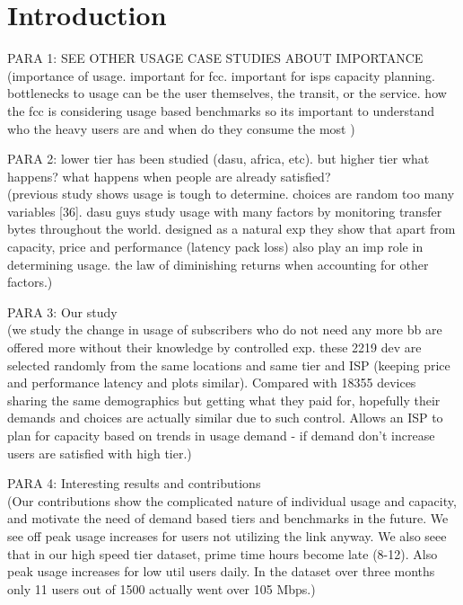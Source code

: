 \section{Introduction}\label{sec:introduction}

PARA 1: SEE OTHER USAGE CASE STUDIES ABOUT IMPORTANCE\\
(importance of usage. important for fcc. important for isps capacity planning. bottlenecks to usage can be the user themselves, the transit, or the service. how the fcc is considering usage based benchmarks so its important to understand who the heavy users are and when do they consume the most )

PARA 2: lower tier has been studied (dasu, africa, etc). but higher tier what happens? what happens when people are already satisfied?\\
(previous study shows usage is tough to determine. choices are random too many variables [36]. dasu guys study usage with many factors by monitoring transfer bytes throughout the world. designed as a natural exp they show that apart from capacity, price and performance (latency pack loss) also play an imp role in determining usage. the law of diminishing returns when accounting for other factors.)

PARA 3: Our study\\
(we study the change in usage of subscribers who do not need any more bb are offered more without their knowledge by controlled exp. these 2219 dev are selected randomly from the same locations and same tier and ISP (keeping price and performance latency and plots similar). Compared with 18355 devices sharing the same demographics but getting what they paid for, hopefully their demands and choices are actually similar due to such control. Allows an ISP to plan for capacity based on trends in usage demand - if demand don't increase users are satisfied with high tier.)

PARA 4: Interesting results and contributions\\
(Our contributions show the complicated nature of individual usage and capacity, and motivate the need of demand based tiers and benchmarks in the future. We see off peak usage increases for users not utilizing the link anyway. We also seee that in our high speed tier dataset, prime time hours become late (8-12). Also peak usage increases for low util users daily. In the dataset over three months only 11 users out of 1500 actually went over 105 Mbps.) 

